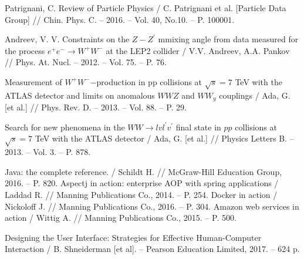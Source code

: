 	Patrignani, C. Review of Particle Physics 
	/ C. Patrignani et al. [Particle Data Group]
	// Chin. Phys. C. – 2016. – Vol. 40, No.10. – P. 100001.
	

	Andreev, V. V. Constraints on the $Z-Z^\prime$ mmixing angle from data measured for the process $e^+e^- \rightarrow W^+W^-$ at the LEP2 collider
	/ V.V. Andreev, A.A. Pankov
	// Phys. At. Nucl. – 2012. – Vol. 75. – P. 76.

	Measurement of $W^+W^-$−production in pp collisions at $\sqrt{s}=7$ TeV with the ATLAS detector and limits on anomalous $WWZ$ and $WW_y$ couplings
	/ Ada, G. [et al.] 
	// Phys. Rev. D. – 2013. – Vol. 88. – P. 29.
	
	Search for new phenomena in the $WW \rightarrow lvl^{\prime}v^{\prime}$ final state in $pp$ collisions at $\sqrt{s}=7$ TeV with the ATLAS detector
	/ Ada, G. [et al.] 
	// Physics Letters B. – 2013. – Vol. 3. – P. 878.




	Java: the complete reference. 
	/ Schildt H. 
	// McGraw-Hill Education Group, 2016. – P. 820.
	Aspectj in action: enterprise AOP with spring applications
	/ Laddad R. 
	// Manning Publications Co., 2014. – P. 254.
	Docker in action
	/ Nickoloff J.
	// Manning Publications Co., 2016. – P. 304.
	Amazon web services in action
	/ Wittig A.
	// Manning Publications Co., 2015. – P. 500.


	 
	 Designing the User Interface: Strategies for Effective Human-Computer
	 Interaction
	 / B. Shneiderman [et al]. – Pearson Education Limited, 2017. – 624 p. 

	 

	

	 

	




